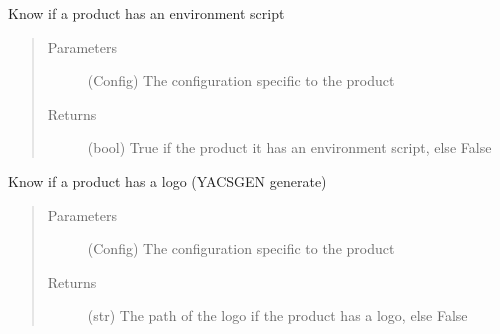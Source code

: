\documentclass[a4paper,10pt,english]{sphinxmanual}
\begin{document}

\begin{fulllineitems}
\label{\detokenize{apidoc_src/src:src.product.product_has_env_script}}
Know if a product has an environment script
\begin{quote}\begin{description}
\item[{Parameters}] \leavevmode
{} \textendash{} (Config)
The configuration specific to the product

\item[{Returns}] \leavevmode
(bool) 
True if the product it has an environment script, else False

\end{description}\end{quote}

\end{fulllineitems}


\begin{fulllineitems}
\label{\detokenize{apidoc_src/src:src.product.product_has_logo}}
Know if a product has a logo (YACSGEN generate)
\begin{quote}\begin{description}
\item[{Parameters}] \leavevmode
{} \textendash{} (Config)
The configuration specific to the product

\item[{Returns}] \leavevmode
(str) 
The path of the logo if the product has a logo, else False

\end{description}\end{quote}

\end{fulllineitems}

\end{document}
